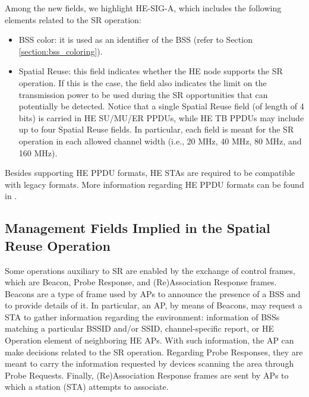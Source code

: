 \documentclass{ieeeaccess}
\begin{document}
Among the new fields, we highlight HE-SIG-A, which includes the following elements related to the SR operation:
\begin{itemize}
	\item BSS color: it is used as an identifier of the BSS (refer to Section \ref{section:bss_coloring}).
	\item Spatial Reuse: this field indicates whether the HE node supports the SR operation. If this is the case, the field also indicates the limit on the transmission power to be used during the SR opportunities that can potentially be detected. Notice that a single Spatial Reuse field (of length of 4 bits) is carried in HE SU/MU/ER PPDUs,  while HE TB PPDUs may include up to four Spatial Reuse fields. In particular, each field is meant for the SR operation in each allowed channel width (i.e., 20 MHz, 40 MHz, 80 MHz, and 160 MHz).
\end{itemize}

Besides supporting HE PPDU formats, HE STAs are required to be compatible with legacy formats. More information regarding HE PPDU formats can be found in \cite{rhode2017whitepaper}. 

\subsection{Management Fields Implied in the Spatial Reuse Operation}
Some operations auxiliary to SR are enabled by the exchange of control frames, which are Beacon, Probe Response, and (Re)Association Response frames. Beacons are a type of frame used by APs to announce the presence of a BSS and to provide details of it. In particular, an AP, by means of Beacons, may request a STA to gather information regarding the environment: information of BSSs matching a particular BSSID and/or SSID, channel-specific report, or HE Operation element of neighboring HE APs. With such information, the AP can make decisions related to the SR operation. Regarding Probe Responses, they are meant to carry the information requested by devices scanning the area through Probe Requests. Finally, (Re)Association Response frames are sent by APs to which a station (STA) attempts to associate.
\end{document}
